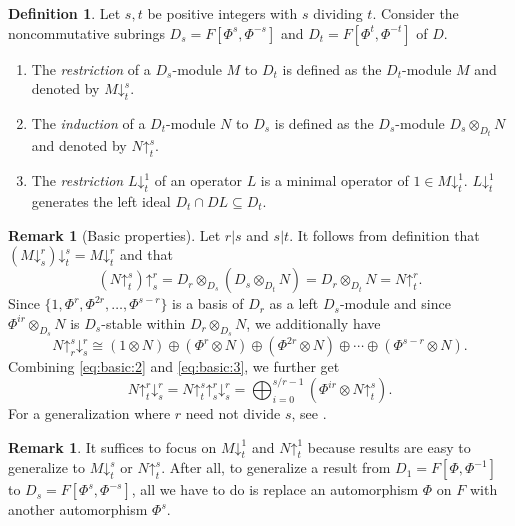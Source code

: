 \documentclass[11pt,reqno]{amsart}
\theoremstyle{definition}
\newtheorem{definition}[theorem]{Definition}
\newtheorem{remark}[theorem]{Remark}
\newcommand{\pda}{\mathord{\downarrow}}
\newcommand{\pua}{\mathord{\uparrow}}
\begin{document}
\begin{definition}\label{def51} Let $s,t$ be positive integers with $s$ dividing $t$. Consider the noncommutative subrings $D_s=F[\Phi^{s},\Phi^{-s}]$ and $D_t=F[\Phi^{t},\Phi^{-t}]$ of $D$.
\begin{enumerate}
    \item The \emph{restriction} of a $D_s$-module $M$ to $D_{t}$ is defined as the $D_{t}$-module $M$ and denoted by $M\pda^{s}_{t}$.
    \item The \emph{induction} of a $D_{t}$-module $N$ to $D_s$ is defined as the $D_s$-module $D_s\otimes_{D_t}N$ and denoted by $N\pua^{s}_{t}$.
    \item The \emph{restriction} $L\pda^{1}_{t}$ of an operator $L$ is a minimal operator of $1 \in M\pda^{1}_{t}$. $L\pda^{1}_{t}$
    generates the left ideal $D_{t}\cap DL \subseteq D_{t}$.
\end{enumerate}
\end{definition}

\begin{remark}[Basic properties]
\label{remark:basic-properties}
    Let $r | s$ and $s | t$. It follows from definition that $(M\pda^r_s)\pda^s_t=M\pda^r_t$ and that 
    \begin{equation}
    \label{eq:basic:2}
    (N\pua_t^s)\pua_s^r
    =D_r\otimes_{D_s}\left(D_{s}\otimes_{D_t}N\right)
    = D_r\otimes_{D_t}N
    =N\pua^r_t.
    \end{equation}
    Since $\{1, \Phi^{r},\Phi^{2r},\dots,\Phi^{s-r}\}$ is a basis of $D_r$ as a left $D_s$-module and since $\Phi^{ir}\otimes_{D_s} N$ is $D_s$-stable within $D_r\otimes_{D_s} N$, we additionally have
    \begin{equation}
    \label{eq:basic:3}
        N\pua_r^s\pda^r_s\cong (1\otimes N)\oplus(\Phi^{r}\otimes N)\oplus(\Phi^{2r}\otimes N)\oplus\cdots\oplus(\Phi^{s-r}\otimes N).
    \end{equation}
    Combining \eqref{eq:basic:2} and \eqref{eq:basic:3}, we further get
    $$N\pua_t^r\pda^r_s = N\pua^{s}_{t}\pua^{r}_{s}\pda^{r}_{s} = \bigoplus_{i=0}^{s/r-1} (\Phi^{ir}\otimes N\pua^{s}_{t}).
    $$
    For a generalization where $r$ need not divide $s$, see .
\end{remark}

\begin{remark} \label{remark:basic-logic}
It suffices to focus on $M\pda^1_t$ and $N\pua^1_{t}$ because results are easy to generalize to $M\pda^{s}_{t}$ or $N\pua^{s}_{t}$.  After all, to generalize a result from $D_1 = F[\Phi,\Phi^{-1}]$ to $D_s=F[\Phi^s,\Phi^{-s}]$, all we have to do is replace an automorphism $\Phi$ on $F$ with another automorphism $\Phi^s$.
\end{remark}
\end{document}
